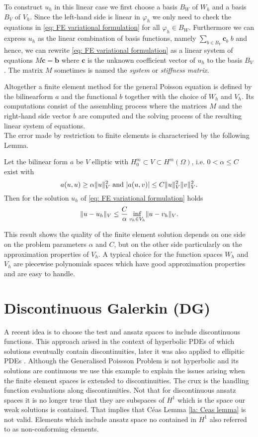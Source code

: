 To construct $u_h$ in this linear case we first choose a basis $B_W$ of $W_h$ and a basis $B_V$ of $V_h$.
Since the left-hand side is linear in $\varphi_h$ we only need to check the equations in \eqref{eq: FE variational formulation} for all $\varphi_h \in B_W$. 
Furthermore we can express $u_h$ as the linear combination of basis functions, namely $\sum_{b \in B_V} \mathbf{c}_b \; b$ and hence, we can rewrite \eqref{eq: FE variational formulation} as a linear system of equations $M \mathbf{c} = \mathbf{b}$ where  $\mathbf{c}$ is the unknown coefficient vector of $u_h$ to the basis $B_V$.  The matrix $M$ sometimes is named the \emph{system} or \emph{stiffness matrix}.

Altogether a finite element method for the general Poisson equation is defined by the bilinearform $a$ and the functional $b$ together with the choice of $W_h$ and $V_h$. Its computations consist of the assembling process where the matrices $M$ and the right-hand side vector $b$ are computed and the solving process of the resulting linear system of equations.\\
The error made by restriction to finite elements is characterised by the following Lemma.
\begin{lemma} \label{la: Ceas lemma}
	Let the bilinear form $a$ be $V$ elliptic with $H_0^m \subset V \subset H^m(\Omega) $, i.e. $0 < \alpha \leq C$ exist with
	\[
		a(u,u) \geq \alpha  \lVert u \rVert ^2_V \text{ and } |a(u,v)| \leq C \lVert u \rVert ^2_V \lVert v \rVert ^2_V.
	\]
	Then for the solution $u_h$ of \eqref{eq: FE variational formulation}  holds
	\begin{align}
		\lVert u - u_h \rVert_V \leq \frac C \alpha \inf\limits_{v_h \in V_h} \lVert u-v_h \rVert_V.
	\end{align}
\end{lemma}
This result shows the quality of the finite element solution depends on one side on the problem parameters $\alpha$ and $C$, but on the other side particularly on the approximation properties of $V_h$. A typical choice for the function spaces $W_h$ and $V_h$ are piecewise polynomials spaces which have good approximation properties and are easy to handle.

\section{Discontinuous Galerkin (DG)} \label{sec: SIPG}
A recent idea is to choose the test and ansatz spaces to include discontinuous functions. This approach arised in the context of hyperbolic PDEs of which solutions eventually contain discontinuities, later it was also applied to ellipitic PDEs \cite{ABC+2002}. Although the Generalised Poissson Problem is not hyperbolic and its solutions are continuous we use this example to explain the issues arising when the finite element spaces is extended to discontinuities. The crux is the handling function evaluations along discontinuities. Not that for discontinuous ansatz spaces it is no longer true that they are subspaces of $H^1$ which is the space our weak solutions is contained. That implies that C\'eas Lemma \ref{la: Ceas lemma} is not valid. Elements which include ansatz space no contained in $H^1$ also referred to as non-conforming elements.

